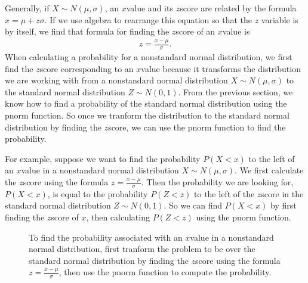 \documentclass[letterpaper,10pt,english]{jupyterBook}
\begin{document}
\sphinxAtStartPar
Generally, if \(X \sim N(\mu, \sigma)\), an \(x\)\sphinxhyphen{}value and its \(z\)\sphinxhyphen{}score are related by the formula \(x = \mu + z\sigma\). If we use algebra to rearrange this equation so that the \(z\) variable is by itself, we find that formula for finding the \(z\)\sphinxhyphen{}score of an \(x\)\sphinxhyphen{}value is
\begin{equation*}
\begin{split} z = \frac{x - \mu}{\sigma}. \end{split}
\end{equation*}
\sphinxAtStartPar
When calculating a probability for a non\sphinxhyphen{}standard normal distribution, we first find the \(z\)\sphinxhyphen{}score corresponding to an \(x\)\sphinxhyphen{}value because it transforms the distribution we are working with from a non\sphinxhyphen{}standard normal distribution \(X \sim N(\mu, \sigma)\) to the standard normal distribution \(Z \sim N(0, 1)\). From the previous section, we know how to find a probability of the standard normal distribution using the pnorm function. So once we tranform the distribution to the standard normal distribution by finding the \(z\)\sphinxhyphen{}score, we can use the pnorm function to find the probability.

\sphinxAtStartPar
For example, suppose we want to find the probability \(P(X < x)\) to the left of an \(x\)\sphinxhyphen{}value in a non\sphinxhyphen{}standard normal distribution \(X \sim N(\mu, \sigma)\). We first calculate the \(z\)\sphinxhyphen{}score using the formula \(z = \frac{x - \mu}{\sigma}\). Then the probability we are looking for, \(P(X < x)\), is equal to the probability \(P(Z < z)\) to the left of the \(z\)\sphinxhyphen{}score in the standard normal distribution \(Z \sim N(0, 1)\). So we can find \(P(X < x)\) by first finding the \(z\)\sphinxhyphen{}score of \(x\), then calculating \(P(Z < z)\) using the pnorm function.

\begin{figure}[htbp]
\centering
\capstart

\noindent{}
\caption{To find the probability associated with an \(x\)\sphinxhyphen{}value in a non\sphinxhyphen{}standard normal distribution, first tranform the problem to be over the standard normal distribution by finding the \(z\)\sphinxhyphen{}score using the formula \(z = \frac{x - \mu}{\sigma}\), then use the pnorm function to compute the probability.}\label{\detokenize{Ch4 The Normal Distribution and the Central Limit Theorem/4.3 The Normal Distribution and z-scores:pnorm-zscore}}\end{figure}
\end{document}
